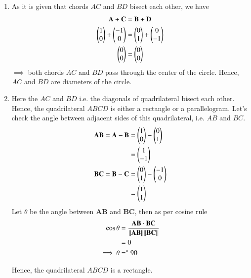 \documentclass[journal,12pt,twocolumn]{IEEEtran}
\let\vec\mathbf
\begin{document}
\begin{enumerate}
    \item As it is given that chords $AC$ and $BD$ bisect each other, we have
    \begin{align}
        \vec{A} + \vec{C} &= \vec{B} + \vec{D} \\
        \myvec{1 \\ 0} + \myvec{-1 \\ 0} &= \myvec{0 \\ 1} + \myvec{0 \\ -1} \\
        \myvec{0 \\ 0} &= \myvec{0 \\ 0} 
    \end{align}
    $\implies$ both chords $AC$ and $BD$ pass through the center of the circle.
    Hence, $AC$ and $BD$ are diameters of the circle.

    \item Here the $AC$ and $BD$ i.e. the diagonals of quadrilateral bisect each other. Hence, the quadrilateral $ABCD$ is either a rectangle or a parallelogram.
    Let's check the angle between adjacent sides of this quadrilateral, i.e. $AB$ and $BC$.
    \begin{align}
        \vec{AB} = \vec{A} - \vec{B} &= \myvec{1 \\ 0} - \myvec{0 \\ 1} \\
        &= \myvec{1 \\ -1} \\
        \vec{BC} = \vec{B} - \vec{C} &= \myvec{0 \\ 1} - \myvec{-1 \\ 0} \\
        &= \myvec{1 \\ 1} \\
    \end{align}
    Let $\theta$ be the angle between $\vec{AB}$ and $\vec{BC}$, then as per cosine rule
    \begin{align}
        \cos\theta &= \frac{\vec{AB} \cdot \vec{BC}}{\norm{\vec{AB}} \norm{\vec{BC}}} \\
        &= 0 \\
        \implies \theta &= \degree90
    \end{align}
    
    Hence, the quadrilateral $ABCD$ is a rectangle.
\end{enumerate}
\end{document}
